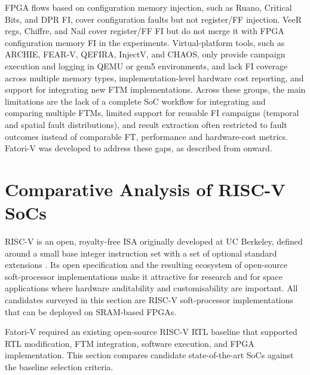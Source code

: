 \ac{FPGA} flows based on configuration memory injection, such as Ruano, Critical Bits, and DPR FI, cover configuration faults but not register/\ac{FF} injection. VeeR regs, Chiffre, and Nail cover register/\ac{FF} \ac{FI} but do not merge it with \ac{FPGA} configuration memory \ac{FI} in the experiments. Virtual-platform tools, such as ARCHIE, FEAR-V, QEFIRA, InjectV, and CHAOS, only provide campaign execution and logging in QEMU or gem5 environments, and lack \ac{FI} coverage across multiple memory types, implementation-level hardware cost reporting, and support for integrating new \ac{FTM} implementations. Across these groups, the main limitations are the lack of a complete \ac{SoC} workflow for integrating and comparing multiple \acp{FTM}, limited support for reusable \ac{FI} campaigns (temporal and spatial fault distributions), and result extraction often restricted to fault outcomes instead of comparable \ac{FT}, performance and hardware-cost metrics. \ac{Fatori-V} was developed to address these gaps, as described from  onward.








\section{Comparative Analysis of RISC-V SoCs}
\label{chap2:analysis}


\ac{RISC-V} is an open, royalty-free \ac{ISA} originally developed at UC Berkeley, defined around a small base integer instruction set with a set of optional standard extensions \cite{riscv-isa}. Its open specification and the resulting ecosystem of open-source soft-processor implementations make it attractive for research and for space applications where hardware auditability and customisability are important. All candidates surveyed in this section are \ac{RISC-V} soft-processor implementations that can be deployed on \ac{SRAM}-based \acp{FPGA}.

\ac{Fatori-V} required an existing open-source \ac{RISC-V} \ac{RTL} baseline that supported \ac{RTL} modification, \ac{FTM} integration, software execution, and \ac{FPGA} implementation. This section compares candidate state-of-the-art \acp{SoC} against the baseline selection criteria.

